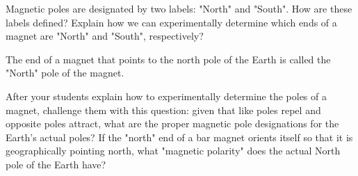 

Magnetic poles are designated by two labels: "North" and "South".  How are these labels defined?  Explain how we can experimentally determine which ends of a magnet are "North" and "South", respectively?







The end of a magnet that points to the north pole of the Earth is called the "North" pole of the magnet.







After your students explain how to experimentally determine the poles of a magnet, challenge them with this question: given that like poles repel and opposite poles attract, what are the proper magnetic pole designations for the Earth's actual poles?  If the "north" end of a bar magnet orients itself so that it is geographically pointing north, what "magnetic polarity" does the actual North pole of the Earth have?




